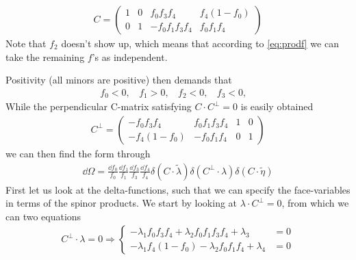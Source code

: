 \documentclass[letter,11pt]{article}
\begin{document}
\begin{equation}
	\begin{aligned}
		C=
		\begin{pmatrix}
			1 & 0 & f_0f_3f_4 & f_4(1-f_0)\\
			0 & 1 & -f_0f_1f_3f_4&f_0f_1f_4
		\end{pmatrix}
	\end{aligned}
\end{equation}
Note that $f_2$ doesn't show up, which means that according to \eqref{eq:prodf} we can take the remaining $f$'s as independent.

Positivity (all minors are positive) then demands that
\begin{equation}
	\begin{aligned}
		f_0<0,~~~~f_1>0,~~~~f_2<0,~~~~f_3<0,~~~~
	\end{aligned}
\end{equation}
While the perpendicular C-matrix satisfying $C\cdot C^\perp=0$ is easily obtained
\begin{equation}
	\begin{aligned}
		C^\perp=
		\begin{pmatrix}
		 -f_0f_3f_4 &f_0f_1f_3f_4 & 1 & 0\\
		-f_4(1-f_0) &-f_0f_1f_4 & 0 & 1
		\end{pmatrix}
	\end{aligned}
\end{equation}
we can then find the form through
\begin{equation}
	\begin{aligned}
		\dd \Omega =\frac{\dd f_0}{f_0}\frac{\dd f_1}{f_1}\frac{\dd f_3}{f_3}\frac{\dd f_4}{f_4}\delta(C\cdot \tilde \lambda) \delta(C^\perp\cdot \lambda)\delta(C\cdot \tilde \eta)
	\end{aligned}
\end{equation}
First let us look at the delta-functions, such that we can specify the face-variables in terms of the spinor products. We start by looking at $\lambda \cdot C^\perp=0$, from which we can two equations
\begin{equation}
	\begin{aligned}
		C^\perp\cdot \lambda=0\Rightarrow\begin{cases}
			-\lambda_1f_0f_3f_4+\lambda_2 f_0f_1f_3f_4+ \lambda_3&=0\\
			-\lambda_1f_4(1-f_0)-\lambda_2f_0f_1f_4+ \lambda_4&=0
		\end{cases}
	\end{aligned}
\end{equation}
\end{document}

